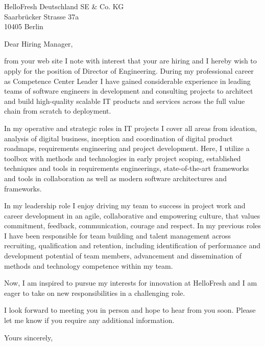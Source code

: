 \documentclass[10pt,a4paper]{dinbrief}
\date{\today}
\begin{document}
 
\begin{letter}  
{%
	HelloFresh Deutschland SE \& Co. KG\\
	Saarbrücker Strasse 37a\\
	10405 Berlin\\
	
}
\subject{\bf Job Application Director of Engineering}
\opening{Dear Hiring Manager,}

from your web site I note with interest that your are  hiring and I hereby wish to apply for the position of Director of Engineering. During my professional career as Competence Center Leader I have gained considerable experience in leading teams of software engineers in development and consulting projects to architect and build high-quality scalable IT products and services across the full value chain from scratch to deployment.

In my operative and strategic roles in IT projects I cover all areas from ideation, analysis of digital business, inception and coordination of digital product roadmaps, requirements engineering and project development. Here, I utilize a toolbox with methods and technologies in early project scoping, established techniques and tools in requirements engineerings, state-of-the-art frameworks and tools in collaboration as well as modern software architectures and frameworks.

In my leadership role I enjoy driving my team to success in project work and career development in an agile, collaborative and empowering culture, that values commitment, feedback, communication, courage and respect. In my previous roles I have been responsible for team building and talent management across recruiting, qualification and retention, including identification of performance and development potential of team members, advancement and dissemination of methods and technology competence within my team.

Now, I am inspired to pursue my interests for innovation at HelloFresh and I am eager to take on new responsibilities in a challenging role.

I look forward to meeting you in person and hope to hear from you soon. Please let me know if you require any additional information.

\closing{Yours sincerely,}
\end{letter}
\end{document}
